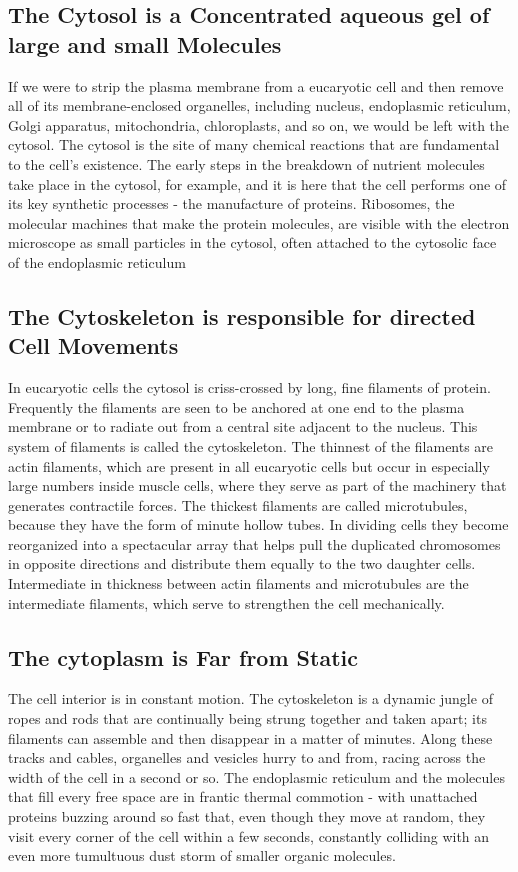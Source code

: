 \subsection{The Cytosol is a Concentrated aqueous gel of large and
small Molecules}

If we were to strip the plasma membrane from a eucaryotic cell and then
remove all of its membrane-enclosed organelles, including nucleus,
endoplasmic reticulum, Golgi apparatus, mitochondria, chloroplasts, and
so on, we would be left with the cytosol. The cytosol is the site of many chemical 
reactions that are fundamental to the cell’s existence. The early steps
in the breakdown of nutrient molecules take place in the cytosol, for
example, and it is here that the cell performs one of its key synthetic processes 
- the manufacture of proteins. Ribosomes, the molecular machines
that make the protein molecules, are visible with the electron microscope
as small particles in the cytosol, often attached to the cytosolic face of the
endoplasmic reticulum

\subsection{The Cytoskeleton is responsible for directed Cell Movements}

In eucaryotic cells the cytosol is criss-crossed by long, fine filaments of protein. Frequently the
filaments are seen to be anchored at one end to the plasma membrane
or to radiate out from a central site adjacent to the nucleus. This system of 
filaments is called the cytoskeleton. The thinnest
of the filaments are actin filaments, which are present in all eucaryotic
cells but occur in especially large numbers inside muscle cells, where
they serve as part of the machinery that generates contractile forces. The
thickest filaments are called microtubules, because they have the form of
minute hollow tubes. In dividing cells they become reorganized into a
spectacular array that helps pull the duplicated chromosomes in opposite
directions and distribute them equally to the two daughter cells. 
Intermediate in thickness between actin filaments and microtubules are the 
intermediate filaments, which serve to strengthen the cell
mechanically.

\subsection{The cytoplasm is Far from Static}

The cell interior is in constant motion. The cytoskeleton is a dynamic
jungle of ropes and rods that are continually being strung together and
taken apart; its filaments can assemble and then disappear in a matter
of minutes. Along these tracks and cables, organelles and
vesicles hurry to and from, racing across the width of the cell in a second or so. The
endoplasmic reticulum and the molecules that fill every free space are in
frantic thermal commotion - with unattached proteins buzzing around
so fast that, even though they move at random, they visit every corner
of the cell within a few seconds, constantly colliding with an even more
tumultuous dust storm of smaller organic molecules.


